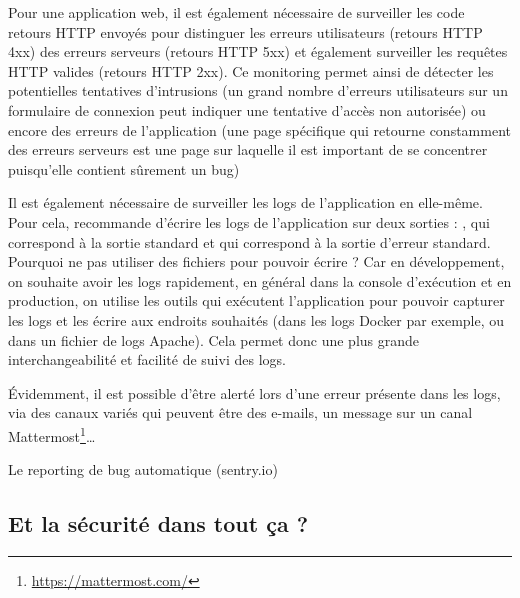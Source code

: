 
Pour une application web, il est également nécessaire de surveiller les code retours \gls{HTTP} envoyés pour distinguer les erreurs utilisateurs (retours \gls{HTTP} 4xx) des erreurs serveurs (retours \gls{HTTP} 5xx) et également surveiller les requêtes \gls{HTTP} valides (retours \gls{HTTP} 2xx). Ce monitoring permet ainsi de détecter les potentielles tentatives d'intrusions (un grand nombre d'erreurs utilisateurs sur un formulaire de connexion peut indiquer une tentative d'accès non autorisée) ou encore des erreurs de l'application (une page spécifique qui retourne constamment des erreurs serveurs est une page sur laquelle il est important de se concentrer puisqu'elle contient sûrement un bug)

Il est également nécessaire de surveiller les logs de l'application en elle-même. Pour cela,  \cite{12factor} recommande d'écrire les logs de l'application sur deux sorties : , qui correspond à la sortie standard et  qui correspond à la sortie d'erreur standard. Pourquoi ne pas utiliser des fichiers pour pouvoir écrire ? Car en développement, on souhaite avoir les logs rapidement, en général dans la console d'exécution et en production, on utilise les outils qui exécutent l'application pour pouvoir capturer les logs et les écrire aux endroits souhaités (dans les logs Docker par exemple, ou dans un fichier de logs Apache). Cela permet donc une plus grande interchangeabilité et facilité de suivi des logs. 

Évidemment, il est possible d'être alerté lors d'une erreur présente dans les logs, via des canaux variés qui peuvent être des e-mails, un message sur un canal Mattermost\footnote{\url{https://mattermost.com/}}\ldots{}



Le reporting de bug automatique (sentry.io)



\subsection{Et la sécurité dans tout ça ?}

